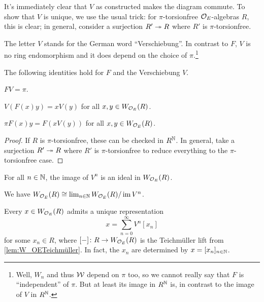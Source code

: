 \begin{proof*}
	It's immediately clear that $V$ as constructed makes the diagram commute. To show that $V$ is unique, we use the usual trick: for $\pi$-torsionfree $\mathcal{O}_E$-algebras $R$, this is clear; in general, consider a surjection $R'\epimorphism R$ where $R'$ is $\pi$-torsionfree.
\end{proof*}
The letter $V$ stands for the German word \enquote{Verschiebung}. In contrast to $F$, $V$ is no ring endomorphism and it does depend on the choice of $\pi$.\footnote{Well, $W_n$ and thus $\mathcal{W}$ depend on $\pi$ too, so we cannot really say that $F$ is \enquote{independent} of $\pi$. But at least its image in $R^{\mathbb{N}}$ is, in contrast to the image of $V$ in $R^{\mathbb{N}}$.}
\begin{lem}\label{lem:FVidentities}
	The following identities hold for $F$ and the Verschiebung $V$.
	\begin{numerate}
		\item $FV=\pi$.
		\item $V(F(x)y)=xV(y)$ for all $x,y\in W_{\mathcal{O}_E}(R)$.
		\item $\pi F(x)y=F(xV(y))$ for all $x,y\in W_{\mathcal{O}_E}(R)$. 
	\end{numerate}
\end{lem}
\begin{proof}
	If $R$ is $\pi$-torsionfree, these can be checked in $R^{\mathbb{N}}$. In general, take a surjection $R'\epimorphism R$ where $R'$ is $\pi$-torsionfree to reduce everything to the $\pi$-torsionfree case.
\end{proof}
\begin{lem}\label{lem:imVn}
	\begin{numerate}
		\item For all $n\in\mathbb{N}$, the image of $V^n$ is an ideal in $W_{\mathcal{O}_E}(R)$.
		\item We have $W_{\mathcal{O}_E}(R)\cong \operatorname*{lim}_{n\in\mathbb{N}}W_{\mathcal{O}_E}(R)/\operatorname{im} V^n$.
		\item Every $x\in W_{\mathcal{O}_E}(R)$ admits a unique representation
		\begin{equation*}
			x=\sum_{n=0}^\infty V^n[x_n]
		\end{equation*}
		for some $x_n\in R$, where $[-]\colon R\morphism W_{\Oo_E}(R)$ is the Teichmüller lift from \cref{lem:W_OETeichmüller}. In fact, the $x_n$ are determined by $x=[x_n]_{n\in\mathbb{N}}$.
	\end{numerate}
\end{lem}
